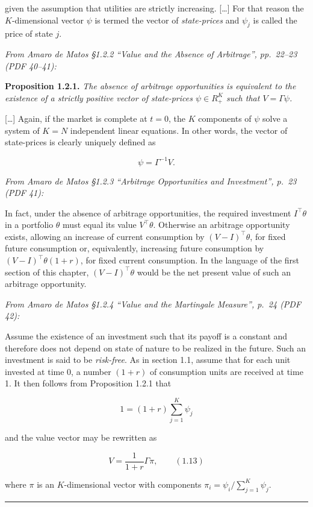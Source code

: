 \documentclass[11pt,a4paper]{article}
\numberwithin{equation}{section}
\newcommand{\stmtend}{\par\endgroup\nopagebreak\noindent\rule{\linewidth}{0.4pt}\par\medskip}
\begin{document}
given the assumption that utilities are strictly increasing. {[}\ldots{]} For that reason the
\(K\)-dimensional vector \(\psi\) is termed the vector of \emph{state-prices} and \(\psi_j\) is
called the price of state \(j\).

\emph{From Amaro de Matos §1.2.2 ``Value and the Absence of Arbitrage'', pp.~22--23 (PDF 40--41):}

\textbf{Proposition 1.2.1.} \emph{The absence of arbitrage opportunities is equivalent to the
existence of a strictly positive vector of state-prices \(\psi \in R^K_+\) such that
\(V = \Gamma\psi\).}

{[}\ldots{]} Again, if the market is complete at \(t = 0\), the \(K\) components of \(\psi\) solve a
system of \(K = N\) independent linear equations. In other words, the vector of state-prices is
clearly uniquely defined as

\[\psi = \Gamma^{-1} V.\]

\emph{From Amaro de Matos §1.2.3 ``Arbitrage Opportunities and Investment'', p.~23 (PDF 41):}

In fact, under the absence of arbitrage opportunities, the required investment \(I^\top\theta\) in a
portfolio \(\theta\) must equal its value \(V^\top\theta\). Otherwise an arbitrage opportunity
exists, allowing an increase of current consumption by \((V - I)^\top\theta\), for fixed future
consumption or, equivalently, increasing future consumption by \((V - I)^\top\theta(1 + r)\), for
fixed current consumption. In the language of the first section of this chapter,
\((V - I)^\top\theta\) would be the net present value of such an arbitrage opportunity.

\emph{From Amaro de Matos §1.2.4 ``Value and the Martingale Measure'', p.~24 (PDF 42):}

Assume the existence of an investment such that its payoff is a constant and therefore does not
depend on state of nature to be realized in the future. Such an investment is said to be
\emph{risk-free}. As in section 1.1, assume that for each unit invested at time 0, a number
\((1 + r)\) of consumption units are received at time 1. It then follows from Proposition 1.2.1 that

\[1 = (1 + r) \sum_{j=1}^{K} \psi_j\]

and the value vector may be rewritten as

\[V = \frac{1}{1 + r} \Gamma \pi, \qquad (1.13)\]

where \(\pi\) is an \(K\)-dimensional vector with components
\(\pi_i = \psi_i \big/ \sum_{j=1}^{K} \psi_j\).
\stmtend
\end{document}
